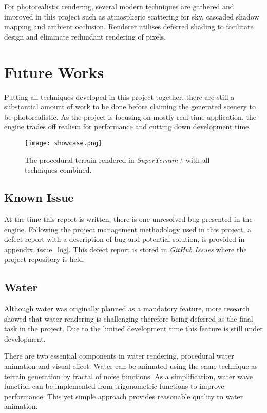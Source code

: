 \documentclass[oneside, a4paper]{report}
\begin{document}
    For photorealistic rendering, several modern techniques are gathered and improved in this project such as atmospheric scattering for sky, cascaded shadow mapping and ambient occlusion. Renderer utilises deferred shading to facilitate design and eliminate redundant rendering of pixels.

    \section{Future Works}

    Putting all techniques developed in this project together, there are still a substantial amount of work to be done before claiming the generated scenery to be photorealistic. As the project is focusing on mostly real-time application, the engine trades off realism for performance and cutting down development time.

    \begin{figure}[H]
        \texttt{[image: showcase.png]}
        \caption{The procedural terrain rendered in \textit{SuperTerrain+} with all techniques combined.}
    \end{figure}

    \subsection{Known Issue}

    At the time this report is written, there is one unresolved bug presented in the engine. Following the project management methodology used in this project, a defect report with a description of bug and potential solution, is provided in appendix \ref{issue_log}. This defect report is stored in \textit{GitHub Issues} where the project repository is held.

    \subsection{Water}

    Although water was originally planned as a mandatory feature, more research showed that water rendering is challenging therefore being deferred as the final task in the project. Due to the limited development time this feature is still under development.

    There are two essential components in water rendering, procedural water animation and visual effect. Water can be animated using the same technique as terrain generation by fractal of noise functions. As a simplification, water wave function can be implemented from trigonometric functions to improve performance. This yet simple approach provides reasonable quality to water animation.
\end{document}

